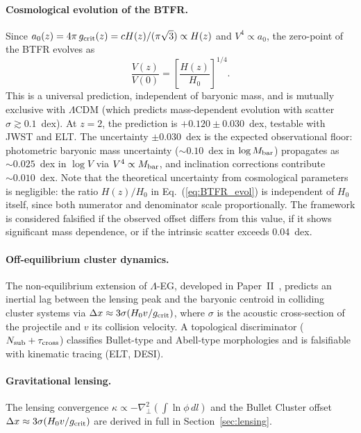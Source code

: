 \documentclass[11pt,a4paper]{article}
\begin{document}
\paragraph{Cosmological evolution of the BTFR.}
Since $a_0(z) = 4\pi\,g_{\rm crit}(z) = cH(z)/(\pi\sqrt{3})\propto H(z)$ and $V^4\propto a_0$,
the zero-point of the BTFR evolves as
\begin{equation}
  \frac{V(z)}{V(0)} = \left[\frac{H(z)}{H_0}\right]^{1/4}.
  \label{eq:BTFR_evol}
\end{equation}
This is a universal prediction, independent of baryonic mass, and is mutually exclusive
with $\Lambda$CDM (which predicts mass-dependent evolution with scatter $\sigma\gtrsim0.1$~dex).
At $z=2$, the prediction is $+0.120\pm0.030$~dex, testable with JWST and ELT.
The uncertainty $\pm0.030$~dex is the expected observational floor: photometric
baryonic mass uncertainty ($\sim0.10$~dex in $\log M_{\rm bar}$) propagates as
$\sim0.025$~dex in $\log V$ via $V^4\propto M_{\rm bar}$, and inclination
corrections contribute $\sim0.010$~dex.  Note that the theoretical uncertainty
from cosmological parameters is negligible: the ratio $H(z)/H_0$ in
Eq.~(\ref{eq:BTFR_evol}) is independent of $H_0$ itself, since both numerator
and denominator scale proportionally.
The framework is considered falsified if the observed offset differs from this value,
if it shows significant mass dependence, or if the intrinsic scatter exceeds 0.04~dex.

\paragraph{Off-equilibrium cluster dynamics.}
The non-equilibrium extension of $\Lambda$-EG, developed in Paper~II~\cite{PaperII},
predicts an inertial lag between the lensing peak and the baryonic centroid in
colliding cluster systems via $\Delta x \approx 3\sigma(H_0 v/g_{\rm crit})$, where
$\sigma$ is the acoustic cross-section of the projectile and $v$ its collision velocity.
A topological discriminator ($N_{\rm sub} + \tau_{\rm cross}$) classifies Bullet-type
and Abell-type morphologies and is falsifiable with kinematic tracing (ELT, DESI).

\paragraph{Gravitational lensing.}
The lensing convergence $\kappa\propto-\nabla_\perp^2(\int\ln\phi\,dl)$ and the
Bullet Cluster offset $\Delta x\approx3\sigma(H_0 v/g_{\rm crit})$ are derived in
full in Section~\ref{sec:lensing}.
\end{document}
